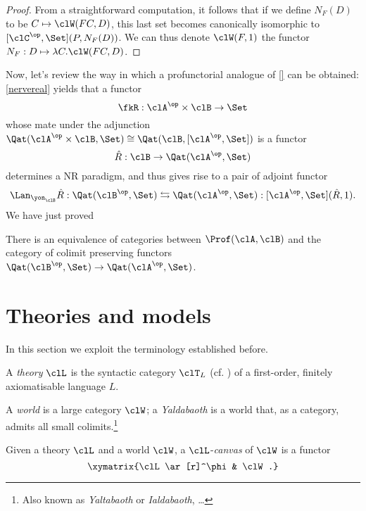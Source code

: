 \documentclass[a4paper]{../birkjour}
\begin{document}
\begin{proof}
	From a straightforward computation, it follows that if we define $N_F(D)$ to be $C\mapsto \clW(F C,D)$, this last set becomes canonically isomorphic to $[\clC^\op,\Set](P,N_F(D))$. We can thus denote $\clW(F,1)$ the functor $N_F : D\mapsto \lambda C.\clW(F C,D)$.
\end{proof}
Now, let's review the way in which a profunctorial analogue of \ref{} can be obtained: \autoref{nervereal} yields that a functor 
\[ \fkR : \clA^\op\times \clB \to \Set \]
whose mate under the adjunction $\Qat(\clA^\op\times \clB ,\Set)\cong\Qat(\clB,[\clA^\op,\Set])$ is a functor 
\[ \hat R : \clB \to \Qat(\clA^\op,\Set) \]
determines a NR paradigm, and thus gives rise to a pair of adjoint functor 
\[ \Lan_{\yon_\clB} \hat R : \Qat(\clB^\op,\Set) \leftrightarrows \Qat(\clA^\op,\Set) : [\clA^\op,\Set](\hat R,1). \]
We have just proved 
\begin{proposition}
  There is an equivalence of categories between $\Prof(\clA,\clB)$ and the category of colimit preserving functors $\Qat(\clB^\op,\Set) \to \Qat(\clA^\op,\Set)$.
\end{proposition}
\section{Theories and models}
\label{sec:orge02f333}
In this section we exploit the terminology established before.
\begin{definition}[Theory]
  A \emph{theory} $\clL$ is the syntactic category $\clT_L$ (cf. \cite{lambek1988introduction}) of a first-order, finitely axiomatisable language $L$.
\end{definition}
\begin{definition}
  A \emph{world} is a large category $\clW$; a \emph{Yaldabaoth} is a world that, as a category, admits all small colimits.\footnote{Also known as \emph{Yaltabaoth} or \emph{Ialdabaoth}, \dots}
\end{definition}
Given a theory $\clL$ and a world $\clW$, a $\clL$-\emph{canvas} of $\clW$ is a functor 
\[\xymatrix{\clL \ar[r]^\phi & \clW.}\]
\end{document}
